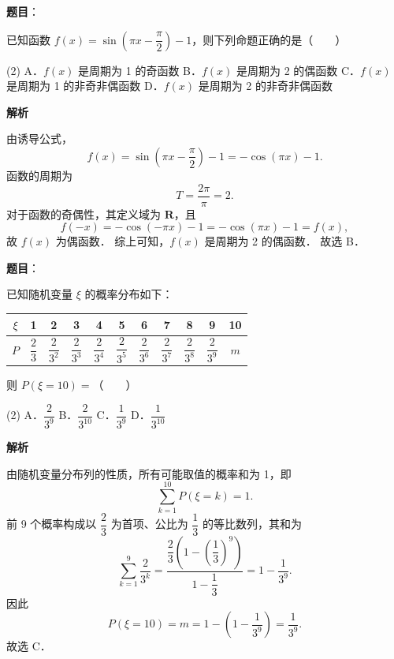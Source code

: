 \begin{answer}

\textbf{题目}：

已知函数 $f(x) = \sin\left(\pi x - \dfrac{\pi}{2}\right) - 1$，则下列命题正确的是\mbox{（　　）}

\begin{gkopts}(2)
\task A．$f(x)$ 是周期为 1 的奇函数
\task B．$f(x)$ 是周期为 2 的偶函数
\task C．$f(x)$ 是周期为 1 的非奇非偶函数
\task D．$f(x)$ 是周期为 2 的非奇非偶函数
\end{gkopts}

\textbf{解析}

由诱导公式，
\nopagebreak[4]
\[
f(x) = \sin\left(\pi x - \frac{\pi}{2}\right) - 1 = -\cos(\pi x) - 1.
\]
函数的周期为
\nopagebreak[4]
\[
T = \frac{2\pi}{\pi} = 2.
\]
对于函数的奇偶性，其定义域为 $\mathbf{R}$，且
\nopagebreak[4]
\[
f(-x) = -\cos(-\pi x) - 1 = -\cos(\pi x) - 1 = f(x),
\]
故 $f(x)$ 为偶函数．
综上可知，$f(x)$ 是周期为 2 的偶函数．
故选 B．


\end{answer}
\begin{answer}

\textbf{题目}：

已知随机变量 $\xi$ 的概率分布如下：

\begin{center}
\begingroup\setlength{\tabcolsep}{4pt}
\begin{tabular}{ccccccccccc}
\toprule
$\xi$ & 1 & 2 & 3 & 4 & 5 & 6 & 7 & 8 & 9 & 10 \\
\midrule
$P$ & $\dfrac{2}{3}$ & $\dfrac{2}{3^2}$ & $\dfrac{2}{3^3}$ & $\dfrac{2}{3^4}$ & $\dfrac{2}{3^5}$ & $\dfrac{2}{3^6}$ & $\dfrac{2}{3^7}$ & $\dfrac{2}{3^8}$ & $\dfrac{2}{3^9}$ & $m$ \\
\bottomrule
\end{tabular}
\endgroup
\end{center}

则 $P(\xi = 10) =$\mbox{（　　）}

\begin{gkopts}(2)
\task A．$\dfrac{2}{3^9}$
\task B．$\dfrac{2}{3^{10}}$
\task C．$\dfrac{1}{3^9}$
\task D．$\dfrac{1}{3^{10}}$
\end{gkopts}

\textbf{解析}

由随机变量分布列的性质，所有可能取值的概率和为 1，即
\nopagebreak[4]
\[
\sum_{k=1}^{10} P(\xi = k) = 1.
\]
前 9 个概率构成以 $\dfrac{2}{3}$ 为首项、公比为 $\dfrac{1}{3}$ 的等比数列，其和为
\nopagebreak[4]
\[
\sum_{k=1}^9 \frac{2}{3^k} = \frac{\dfrac{2}{3}\left(1 - \left(\dfrac{1}{3}\right)^9\right)}{1 - \dfrac{1}{3}} = 1 - \frac{1}{3^9}.
\]
因此
\nopagebreak[4]
\[
P(\xi = 10) = m = 1 - \left(1 - \frac{1}{3^9}\right) = \frac{1}{3^9}.
\]
故选 C．


\end{answer}

